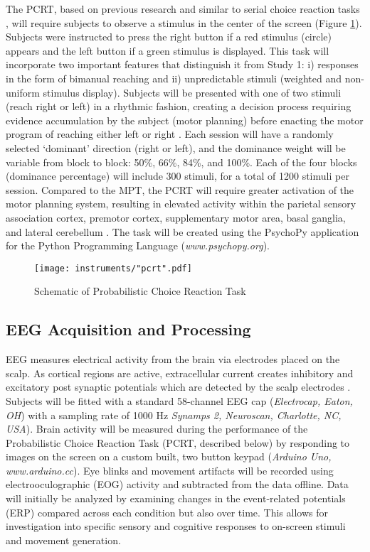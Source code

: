 The PCRT, based on previous research \cite{stetson_early_2015,nobuyuki_timing_2003} and similar to serial choice reaction tasks \cite{praamstra_neurophysiology_2006}, will require subjects to observe a stimulus in the center of the screen (Figure \ref{fig:pcrt}). Subjects were instructed to press the right button if a red stimulus (circle) appears and the left button if a green stimulus is displayed. This task will incorporate two important features that distinguish it from Study 1: i) responses in the form of bimanual reaching and ii) unpredictable stimuli (weighted and non-uniform stimulus display). Subjects will be presented with one of two stimuli (reach right or left) in a rhythmic fashion, creating a decision process requiring evidence accumulation by the subject (motor planning) before enacting the motor program of reaching either left or right \cite{wong_motor_2015}. Each session will have a randomly selected `dominant' direction (right or left), and the dominance weight will be variable from block to block: 50\%, 66\%, 84\%, and 100\%. Each of the four blocks (dominance percentage) will include 300 stimuli, for a total of 1200 stimuli per session. Compared to the MPT, the PCRT will require greater activation of the motor planning system, resulting in elevated activity within the parietal sensory association cortex, premotor cortex, supplementary motor area, basal ganglia, and lateral cerebellum \cite{wing_response_1973}. The task will be created using the PsychoPy application for the Python Programming Language (\textit{www.psychopy.org}). 

\begin{figure}
	\centering
	\texttt{[image: instruments/"pcrt".pdf]}
	\caption{Schematic of Probabilistic Choice Reaction Task}
	\label{fig:pcrt}
\end{figure} 


\subsection{EEG Acquisition and Processing}
EEG measures electrical activity from the brain via electrodes placed on the scalp. As cortical regions are active, extracellular current creates inhibitory and excitatory post synaptic potentials which are detected by the scalp electrodes \cite{kuperberg_electroencephalography_2004}. Subjects will be fitted with a standard 58-channel EEG cap (\textit{Electrocap, Eaton, OH}) with a sampling rate of 1000 Hz \textit{Synamps 2, Neuroscan, Charlotte, NC, USA}). Brain activity will be measured during the performance of the Probabilistic Choice Reaction Task (PCRT, described below) by responding to images on the screen on a custom built, two button keypad (\textit{Arduino Uno, www.arduino.cc}). Eye blinks and movement artifacts will be recorded using electrooculographic (EOG) activity and subtracted from the data offline. Data will initially be analyzed by examining changes in the event-related potentials (ERP) compared across each condition but also over time. This allows for investigation into specific sensory and cognitive responses to on-screen stimuli and movement generation.  

